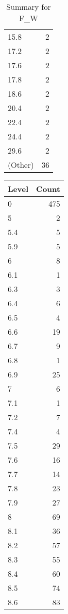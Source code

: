 \begin{table}[ht]
\begin{tabular}{lr}
  15.8 &   2 \\ 
  17.2 &   2 \\ 
  17.6 &   2 \\ 
  17.8 &   2 \\ 
  18.6 &   2 \\ 
  20.4 &   2 \\ 
  22.4 &   2 \\ 
  24.4 &   2 \\ 
  29.6 &   2 \\ 
  (Other) &  36 \\ 
   \hline
\end{tabular}
\caption{Summary for F_W} 
\label{tab: F_W}
\end{table}
\begin{table}[ht]
\centering
\begin{tabular}{lr}
  \hline
Level & Count \\ 
  \hline
0 & 475 \\ 
  5 &   2 \\ 
  5.4 &   5 \\ 
  5.9 &   5 \\ 
  6 &   8 \\ 
  6.1 &   1 \\ 
  6.3 &   3 \\ 
  6.4 &   6 \\ 
  6.5 &   4 \\ 
  6.6 &  19 \\ 
  6.7 &   9 \\ 
  6.8 &   1 \\ 
  6.9 &  25 \\ 
  7 &   6 \\ 
  7.1 &   1 \\ 
  7.2 &   7 \\ 
  7.4 &   4 \\ 
  7.5 &  29 \\ 
  7.6 &  16 \\ 
  7.7 &  14 \\ 
  7.8 &  23 \\ 
  7.9 &  27 \\ 
  8 &  69 \\ 
  8.1 &  36 \\ 
  8.2 &  57 \\ 
  8.3 &  55 \\ 
  8.4 &  60 \\ 
  8.5 &  74 \\ 
  8.6 &  83 \\ 

\end{tabular}
\end{table}
